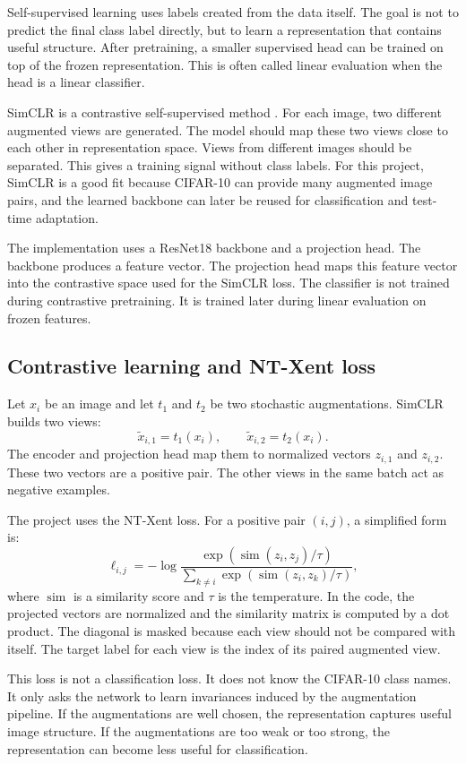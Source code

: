 \documentclass[a4paper,11pt]{article}
\begin{document}
Self-supervised learning uses labels created from the data itself. The goal is not to predict the final class label directly, but to learn a representation that contains useful structure. After pretraining, a smaller supervised head can be trained on top of the frozen representation. This is often called linear evaluation when the head is a linear classifier.

SimCLR is a contrastive self-supervised method \citep{chen2020simclr}. For each image, two different augmented views are generated. The model should map these two views close to each other in representation space. Views from different images should be separated. This gives a training signal without class labels. For this project, SimCLR is a good fit because CIFAR-10 can provide many augmented image pairs, and the learned backbone can later be reused for classification and test-time adaptation.

The implementation uses a ResNet18 backbone and a projection head. The backbone produces a feature vector. The projection head maps this feature vector into the contrastive space used for the SimCLR loss. The classifier is not trained during contrastive pretraining. It is trained later during linear evaluation on frozen features.

\subsection{Contrastive learning and NT-Xent loss}

Let \(x_i\) be an image and let \(t_1\) and \(t_2\) be two stochastic augmentations. SimCLR builds two views:
\[
\tilde{x}_{i,1}=t_1(x_i),\qquad \tilde{x}_{i,2}=t_2(x_i).
\]
The encoder and projection head map them to normalized vectors \(z_{i,1}\) and \(z_{i,2}\). These two vectors are a positive pair. The other views in the same batch act as negative examples.

The project uses the NT-Xent loss. For a positive pair \((i,j)\), a simplified form is:
\[
\ell_{i,j}=-\log \frac{\exp(\operatorname{sim}(z_i,z_j)/\tau)}{\sum_{k\neq i}\exp(\operatorname{sim}(z_i,z_k)/\tau)},
\]
where \(\operatorname{sim}\) is a similarity score and \(\tau\) is the temperature. In the code, the projected vectors are normalized and the similarity matrix is computed by a dot product. The diagonal is masked because each view should not be compared with itself. The target label for each view is the index of its paired augmented view.

This loss is not a classification loss. It does not know the CIFAR-10 class names. It only asks the network to learn invariances induced by the augmentation pipeline. If the augmentations are well chosen, the representation captures useful image structure. If the augmentations are too weak or too strong, the representation can become less useful for classification.
\end{document}
